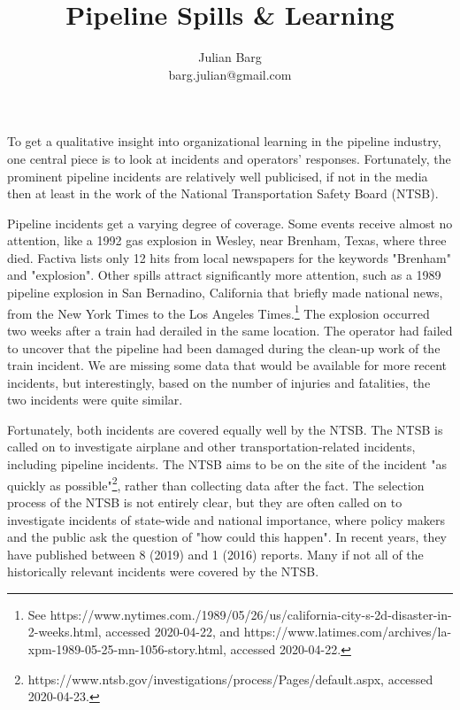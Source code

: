 \documentclass[12pt, man, natbib]{apa6}
\title{Pipeline Spills \& Learning}
\author{Julian Barg\\barg.julian@gmail.com}
\affiliation{Ivey Business School}
\begin{document}
	
	\maketitle
	
	\singlespacing
	
	\section{}
	
	To get a qualitative insight into organizational learning in the pipeline industry, one central piece is to look at incidents and operators' responses. Fortunately, the prominent pipeline incidents are relatively well publicised, if not in the media then at least in the work of the National Transportation Safety Board (NTSB). 
	
	Pipeline incidents get a varying degree of coverage. Some events receive almost no attention, like a 1992 gas explosion in Wesley, near Brenham, Texas, where three died. Factiva lists only 12 hits from local newspapers for the keywords "Brenham" and "explosion". Other spills attract significantly more attention, such as a 1989 pipeline explosion in San Bernadino, California that briefly made national news, from the New York Times to the Los Angeles Times.\footnote{See https://www.nytimes.com./1989/05/26/us/california-city-s-2d-disaster-in-2-weeks.html, accessed 2020-04-22, and https://www.latimes.com/archives/la-xpm-1989-05-25-mn-1056-story.html, accessed 2020-04-22.} The explosion occurred two weeks after a train had derailed in the same location. The operator had failed to uncover that the pipeline had been damaged during the clean-up work of the train incident. We are missing some data that would be available for more recent incidents, but interestingly, based on the number of injuries and fatalities, the two incidents were quite similar.
	
	Fortunately, both incidents are covered equally well by the NTSB. The NTSB is called on to investigate airplane and other transportation-related incidents, including pipeline incidents. The NTSB aims to be on the site of the incident "as quickly as possible"\footnote{https://www.ntsb.gov/investigations/process/Pages/default.aspx, accessed 2020-04-23.}, rather than collecting data after the fact. The selection process of the NTSB is not entirely clear, but they are often called on to investigate incidents of state-wide and national importance, where policy makers and the public ask the question of "how could this happen". In recent years, they have published between 8 (2019) and 1 (2016) reports. Many if not all of the historically relevant incidents were covered by the NTSB.


\end{document}
